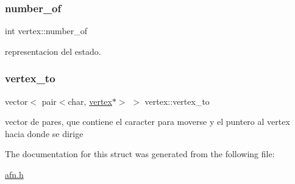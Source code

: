 \subsubsection{\texorpdfstring{number\+\_\+of}{number\_of}}
{\footnotesize\ttfamily int vertex\+::number\+\_\+of}

representacion del estado. \hypertarget{structvertex_af4c8458ab477f8d174bd3764611f18f6}{}\label{structvertex_af4c8458ab477f8d174bd3764611f18f6} 
\subsubsection{\texorpdfstring{vertex\+\_\+to}{vertex\_to}}
{\footnotesize\ttfamily vector$<$ pair$<$char, \hyperlink{structvertex}{vertex}$\ast$$>$ $>$ vertex\+::vertex\+\_\+to}

vector de pares, que contiene el caracter para moverse y el puntero al vertex hacia donde se dirige 

The documentation for this struct was generated from the following file\+:\begin{DoxyCompactItemize}
\item 
\hyperlink{afn_8h}{afn.\+h}\end{DoxyCompactItemize}
